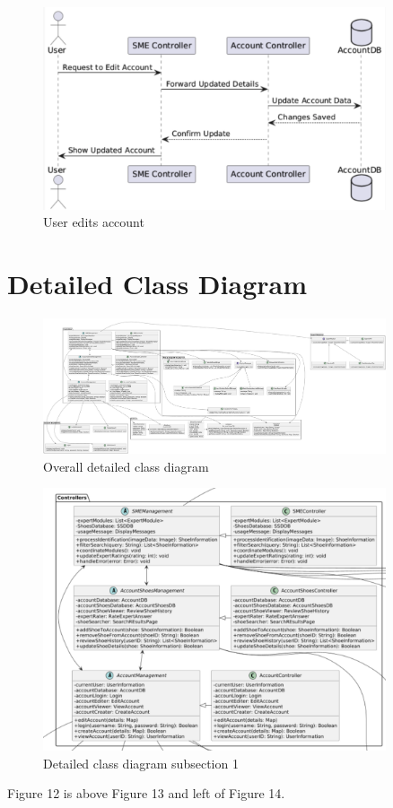 \documentclass[]{article}
\begin{document}
\begin{figure}[H]
    \centering
    \includegraphics[width=0.9\textwidth]{S3/image (7).png}
	\caption{User edits account}
\end{figure}



\newpage
\section{Detailed Class Diagram}
\label{sec:detailed_class_diagram}
\begin{figure}[H]
    \centering
    \includegraphics[width=0.9\textwidth]{fullDiagram.png}
	\caption{Overall detailed class diagram}
\end{figure} 

\begin{figure}[H]
    \centering
    \includegraphics[width=0.9\textwidth]{figure1.png}
	\caption{Detailed class diagram subsection 1}
\end{figure}
Figure 12 is above Figure 13 and left of Figure 14.
\end{document}
